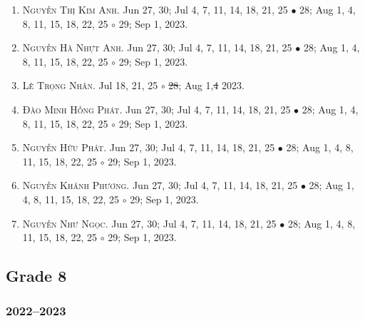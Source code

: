 \documentclass{article}
\begin{document}
\begin{enumerate}
	\item \textsc{Nguyễn Thị Kim Anh.} {\sf[In]} Jun 27, 30; Jul 4, 7, 11, 14, 18, 21, 25 $\bullet$ 28; Aug 1, 4, 8, 11, 15, 18, 22, 25 $\circ$ 29; Sep 1, 2023.
	\item \textsc{Nguyễn Hà Nhựt Anh.} {\sf[In]} Jun 27, 30; Jul 4, 7, 11, 14, 18, 21, 25 $\bullet$ 28; Aug 1, 4, 8, 11, 15, 18, 22, 25 $\circ$ 29; Sep 1, 2023.
	\item \textsc{Lê Trọng Nhân.} {\sf[In]} Jul 18, 21, 25 $\circ$ \st{28}; Aug 1,\st{4} \sf{[Out]} 2023.
	\item \textsc{Đào Minh Hồng Phát.} {\sf[In]} Jun 27, 30; Jul 4, 7, 11, 14, 18, 21, 25 $\bullet$ 28; Aug 1, 4, 8, 11, 15, 18, 22, 25 $\circ$ 29; Sep 1, 2023.
	\item \textsc{Nguyễn Hữu Phát.} {\sf[In]} Jun 27, 30; Jul 4, 7, 11, 14, 18, 21, 25 $\bullet$ 28; Aug 1, 4, 8, 11, 15, 18, 22, 25 $\circ$ 29; Sep 1, 2023.	
	\item \textsc{Nguyễn Khánh Phương.} {\sf[In]} Jun 27, 30; Jul 4, 7, 11, 14, 18, 21, 25 $\bullet$ 28; Aug 1, 4, 8, 11, 15, 18, 22, 25 $\circ$ 29; Sep 1, 2023.
	\item \textsc{Nguyễn Như Ngọc.} {\sf[In]} Jun 27, 30; Jul 4, 7, 11, 14, 18, 21, 25 $\bullet$ 28; Aug 1, 4, 8, 11, 15, 18, 22, 25 $\circ$ 29; Sep 1, 2023.
\end{enumerate}

\subsection{Grade 8}

\subsubsection{2022--2023}
\end{document}
